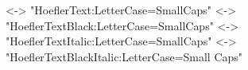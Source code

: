 %
       {<-> "Hoefler\space Text:Letter\space Case=Small\space Caps"}{}
%
       {<-> "Hoefler\space Text\space Black:Letter\space Case=Small\space Caps"}{}
%
       {<-> "Hoefler\space Text\space Italic:Letter\space Case=Small\space Caps"}{}
%
       {<-> "Hoefler\space Text\space Black\space Italic:Letter\space Case=Small\space
       Caps"}{}

\renewcommand{\textbf}{\textsc}


\pagestyle{myheadings}
\renewcommand{\chaptermark}[1]%
{\markboth{\textnormal{\textsc{\lowercase{#1}}}}{\textnormal{\textsc{\lowercase{#1}}}}}

\renewcommand{\subsection}{\minisec}

\raggedcolumns